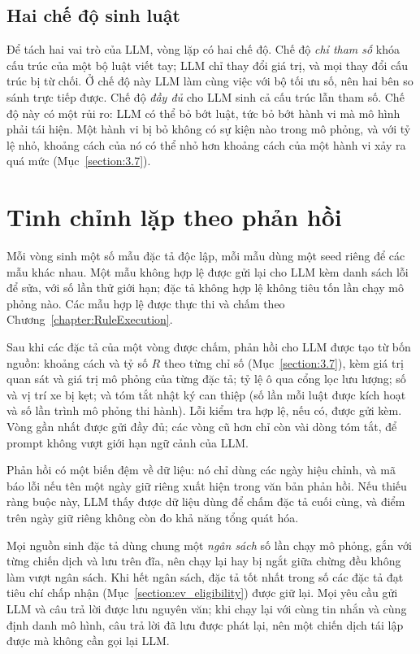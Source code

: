 \documentclass[../main.tex]{subfiles}
\begin{document}
\subsection{Hai chế độ sinh luật}

Để tách hai vai trò của LLM, vòng lặp có hai chế độ. Chế độ \emph{chỉ tham số} khóa cấu trúc của một bộ luật viết tay; LLM chỉ thay đổi giá trị, và mọi thay đổi cấu trúc bị từ chối. Ở chế độ này LLM làm cùng việc với bộ tối ưu số, nên hai bên so sánh trực tiếp được. Chế độ \emph{đầy đủ} cho LLM sinh cả cấu trúc lẫn tham số. Chế độ này có một rủi ro: LLM có thể bỏ bớt luật, tức bỏ bớt hành vi mà mô hình phải tái hiện. Một hành vi bị bỏ không có sự kiện nào trong mô phỏng, và với tỷ lệ nhỏ, khoảng cách của nó có thể nhỏ hơn khoảng cách của một hành vi xảy ra quá mức (Mục~\ref{section:3.7}).

\section{Tinh chỉnh lặp theo phản hồi}
\label{section:ev_feedback}

Mỗi vòng sinh một số mẫu đặc tả độc lập, mỗi mẫu dùng một seed riêng để các mẫu khác nhau. Một mẫu không hợp lệ được gửi lại cho LLM kèm danh sách lỗi để sửa, với số lần thử giới hạn; đặc tả không hợp lệ không tiêu tốn lần chạy mô phỏng nào. Các mẫu hợp lệ được thực thi và chấm theo Chương~\ref{chapter:RuleExecution}.

Sau khi các đặc tả của một vòng được chấm, phản hồi cho LLM được tạo từ bốn nguồn: khoảng cách và tỷ số $R$ theo từng chỉ số (Mục~\ref{section:3.7}), kèm giá trị quan sát và giá trị mô phỏng của từng đặc tả; tỷ lệ ô qua cổng lọc lưu lượng; số và vị trí xe bị kẹt; và tóm tắt nhật ký can thiệp (số lần mỗi luật được kích hoạt và số lần trình mô phỏng thi hành). Lỗi kiểm tra hợp lệ, nếu có, được gửi kèm. Vòng gần nhất được gửi đầy đủ; các vòng cũ hơn chỉ còn vài dòng tóm tắt, để prompt không vượt giới hạn ngữ cảnh của LLM.

Phản hồi có một biến đệm về dữ liệu: nó chỉ dùng các ngày hiệu chỉnh, và mã báo lỗi nếu tên một ngày giữ riêng xuất hiện trong văn bản phản hồi. Nếu thiếu ràng buộc này, LLM thấy được dữ liệu dùng để chấm đặc tả cuối cùng, và điểm trên ngày giữ riêng không còn đo khả năng tổng quát hóa.

Mọi nguồn sinh đặc tả dùng chung một \emph{ngân sách} số lần chạy mô phỏng, gắn với từng chiến dịch và lưu trên đĩa, nên chạy lại hay bị ngắt giữa chừng đều không làm vượt ngân sách. Khi hết ngân sách, đặc tả tốt nhất trong số các đặc tả đạt tiêu chí chấp nhận (Mục~\ref{section:ev_eligibility}) được giữ lại. Mọi yêu cầu gửi LLM và câu trả lời được lưu nguyên văn; khi chạy lại với cùng tin nhắn và cùng định danh mô hình, câu trả lời đã lưu được phát lại, nên một chiến dịch tái lập được mà không cần gọi lại LLM.
\end{document}
